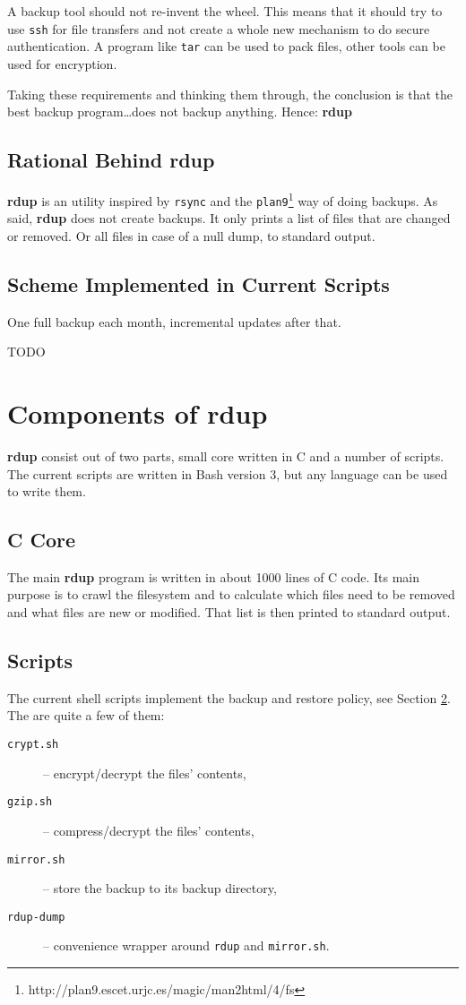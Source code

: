 \documentclass[a4paper, openany]{blocksbook}
\newcommand{\rdup}{\textbf{rdup}}
\newcommand{\cmd}[1]{\texttt{#1}}
\begin{document}
A backup tool should not re-invent the wheel.  This means that it should
try to use \cmd{ssh} for file transfers and not create a whole new
mechanism to do secure authentication. A program like \cmd{tar} can be
used to pack files, other tools can be used for encryption. 

Taking these requirements and thinking them through, the
conclusion is that the best backup program\ldots does not backup anything.
Hence: \rdup

\section{Rational Behind \rdup}
\rdup{} is an utility inspired by \cmd{rsync} and the 
\cmd{plan9}\footnote{http://plan9.escet.urjc.es/magic/man2html/4/fs} 
way of doing backups. As said, \rdup{} does not create backups. It only
prints a list of files that are changed or removed. Or all files in case
of a null dump, to standard output. 

\section{Scheme Implemented in Current Scripts}
\label{sec:scheme implemented in current scripts}
One full backup each month, incremental updates after that.

TODO


\chapter{Components of \rdup}

\rdup{} consist out of two parts, small core written in C and
a number of scripts. The current scripts are written in 
Bash version 3, but any language can be used to write them.

\section{C Core}
The main \rdup{} program is written in about 1000 lines of C code. Its
main purpose is to crawl the filesystem and to calculate which files
need to be removed and what files are new or modified. That list is then
printed to standard output.

\section{Scripts}
The current shell scripts implement the backup and restore policy, see
Section \ref{sec:scheme implemented in current scripts}.
The are quite a few of them:
\begin{description}
\item[\cmd{crypt.sh}]{-- encrypt/decrypt the files' contents,}
\item[\cmd{gzip.sh}]{-- compress/decrypt the files' contents,}
\item[\cmd{mirror.sh}]{-- store the backup to its backup directory,}
\item[\cmd{rdup-dump}]{-- convenience wrapper around \cmd{rdup} and \cmd{mirror.sh}.}
\end{description}
\end{document}
